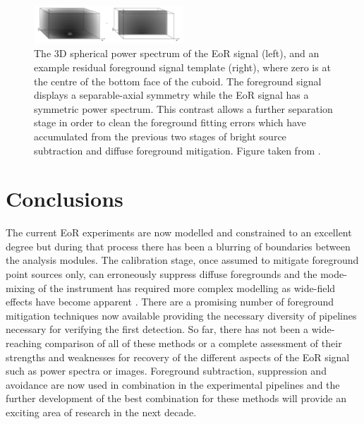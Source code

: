 \begin{figure}
\begin{center}
    \includegraphics[width=0.5\textwidth]{Images/res_sub.png}
\end{center}
    \caption{The 3D spherical power spectrum of the EoR signal (left), and an example residual foreground signal template (right), where zero is at the centre of the bottom face of the cuboid. The foreground signal displays a separable-axial symmetry while the EoR signal has a symmetric power spectrum. This contrast allows a further separation stage in order to clean the foreground fitting errors which have accumulated from the previous two stages of bright source subtraction and diffuse foreground mitigation. Figure taken from \citet{Morales2006ApJ...648..767M}.}
    \label{fig:ressub}
\end{figure}

\section{Conclusions}


The current EoR experiments are now modelled and constrained to an excellent degree but during that process there has been a blurring of boundaries between the analysis modules. The calibration stage, once assumed to mitigate foreground point sources only, can erroneously suppress diffuse foregrounds \citep{Patil2016MNRAS.463.4317P} and the mode-mixing of the instrument has required more complex modelling as wide-field effects have become apparent \citep{Thyagarajan2015ApJ...807L..28T}. There are a promising number of foreground mitigation techniques now available providing the necessary diversity of pipelines necessary for verifying the first detection. So far, there has not been a wide-reaching comparison of all of these methods or a complete assessment of their strengths and weaknesses for recovery of the different aspects of the EoR signal such as power spectra or images. Foreground subtraction, suppression and avoidance are now used in combination in the experimental pipelines and the further development of the best combination for these methods will provide an exciting area of research in the next decade.








